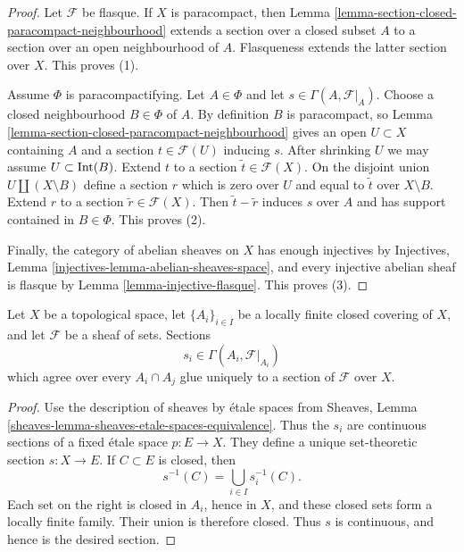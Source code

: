 \begin{proof}
Let $\mathcal{F}$ be flasque. If $X$ is paracompact, then Lemma
\ref{lemma-section-closed-paracompact-neighbourhood} extends a section over
a closed subset $A$ to a section over an open neighbourhood of $A$.
Flasqueness extends the latter section over $X$. This proves (1).

Assume $\Phi$ is paracompactifying. Let $A \in \Phi$ and let
$s \in \Gamma(A, \mathcal{F}|_A)$. Choose a closed neighbourhood
$B \in \Phi$ of $A$. By definition $B$ is paracompact, so Lemma
\ref{lemma-section-closed-paracompact-neighbourhood} gives an open
$U \subset X$ containing $A$ and a section $t \in \mathcal{F}(U)$
inducing $s$. After shrinking $U$ we may assume $U \subset \mathop{\rm
Int}(B)$. Extend $t$ to a section $\widetilde t \in \mathcal{F}(X)$.
On the disjoint union $U \amalg (X \setminus B)$ define a section $r$
which is zero over $U$ and equal to $\widetilde t$ over $X \setminus B$.
Extend $r$ to a section $\widetilde r \in \mathcal{F}(X)$. Then
$\widetilde t - \widetilde r$ induces $s$ over $A$ and has support
contained in $B \in \Phi$. This proves (2).

Finally, the category of abelian sheaves on $X$ has enough injectives by
Injectives, Lemma \ref{injectives-lemma-abelian-sheaves-space}, and every
injective abelian sheaf is flasque by Lemma
\ref{lemma-injective-flasque}. This proves (3).
\end{proof}


\begin{lemma}
\label{lemma-glue-locally-finite-closed}
Let $X$ be a topological space, let $\{A_i\}_{i \in I}$ be a locally
finite closed covering of $X$, and let $\mathcal{F}$ be a sheaf of sets.
Sections
$$
s_i \in \Gamma(A_i, \mathcal{F}|_{A_i})
$$
which agree over every $A_i \cap A_j$ glue uniquely to a section of
$\mathcal{F}$ over $X$.
\end{lemma}

\begin{proof}
Use the description of sheaves by \'etale spaces from
Sheaves, Lemma
\ref{sheaves-lemma-sheaves-etale-spaces-equivalence}.
Thus the $s_i$ are continuous sections of a fixed \'etale space
$p : E \to X$. They define a unique set-theoretic section
$s : X \to E$. If $C \subset E$ is closed, then
$$
s^{-1}(C) = \bigcup_{i \in I}s_i^{-1}(C).
$$
Each set on the right is closed in $A_i$, hence in $X$, and these closed
sets form a locally finite family. Their union is therefore closed.
Thus $s$ is continuous, and hence is the desired section.
\end{proof}

